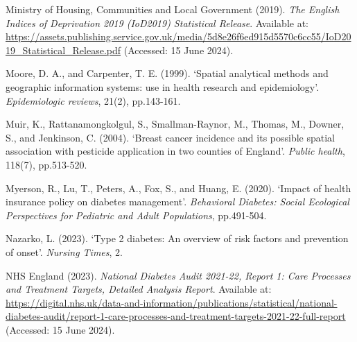 \begin{Reference}
\begin{flushleft}
Ministry of Housing, Communities and Local Government (2019). \textit{The English Indices of Deprivation 2019 (IoD2019) Statistical Release}. Available at: \url{https://assets.publishing.service.gov.uk/media/5d8e26f6ed915d5570c6cc55/IoD2019_Statistical_Release.pdf} (Accessed: 15 June 2024).
\end{flushleft}
\vspace{2pt}


\begin{flushleft}
Moore, D. A., and Carpenter, T. E. (1999). `Spatial analytical methods and geographic information systems: use in health research and epidemiology'. \textit{Epidemiologic reviews}, 21(2), pp.143-161.
\end{flushleft}
\vspace{2pt}


\begin{flushleft}
Muir, K., Rattanamongkolgul, S., Smallman-Raynor, M., Thomas, M., Downer, S., and Jenkinson, C. (2004). `Breast cancer incidence and its possible spatial association with pesticide application in two counties of England'. \textit{Public health}, 118(7), pp.513-520.
\end{flushleft}
\vspace{2pt}


\begin{flushleft}
Myerson, R., Lu, T., Peters, A., Fox, S., and Huang, E. (2020). `Impact of health insurance policy on diabetes management'. \textit{Behavioral Diabetes: Social Ecological Perspectives for Pediatric and Adult Populations}, pp.491-504.
\end{flushleft}
\vspace{2pt}


\begin{flushleft}
Nazarko, L. (2023). `Type 2 diabetes: An overview of risk factors and prevention of onset'. \textit{Nursing Times}, 2.
\end{flushleft}
\vspace{2pt}


\begin{flushleft}
NHS England (2023). \textit{National Diabetes Audit 2021-22, Report 1: Care Processes and Treatment Targets, Detailed Analysis Report}. Available at: \url{https://digital.nhs.uk/data-and-information/publications/statistical/national-diabetes-audit/report-1-care-processes-and-treatment-targets-2021-22-full-report} (Accessed: 15 June 2024).
\end{flushleft}
\vspace{2pt}



\end{Reference}
